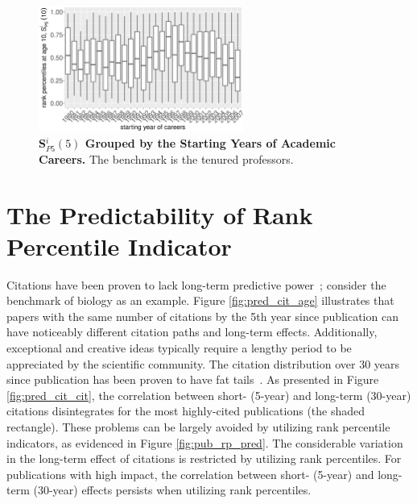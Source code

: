 \begin{figure}[ht!]
    \centering
    \includegraphics[width=0.6\textwidth]{figures/stationarity/rp_stationarity.eps}
    \caption{{\bf S$_{P5}^i(5)$ Grouped by the Starting Years of Academic Careers.}
    The benchmark is the tenured professors.} 
    \label{fig:rp_stationarity}
\end{figure}

\section*{The Predictability of Rank Percentile Indicator}

Citations have been proven to lack long-term predictive power~\cite{Wang2013}; consider the benchmark of biology as an example. Figure \ref{fig:pred_cit_age} illustrates that papers with the same number of citations by the 5th year since publication can have noticeably different citation paths and long-term effects. Additionally, exceptional and creative ideas typically require a lengthy period to be appreciated by the scientific community. The citation distribution over $30$ years since publication has been proven to have fat tails~\cite{Wang2013}. As presented in Figure \ref{fig:pred_cit_cit}, the correlation between short- (5-year) and long-term (30-year) citations disintegrates for the most highly-cited publications (the shaded rectangle). These problems can be largely avoided by utilizing rank percentile indicators, as evidenced in Figure \ref{fig:pub_rp_pred}. The considerable variation in the long-term effect of citations is restricted by utilizing rank percentiles. For publications with high impact, the correlation between short- (5-year) and long-term (30-year) effects persists when utilizing rank percentiles.

